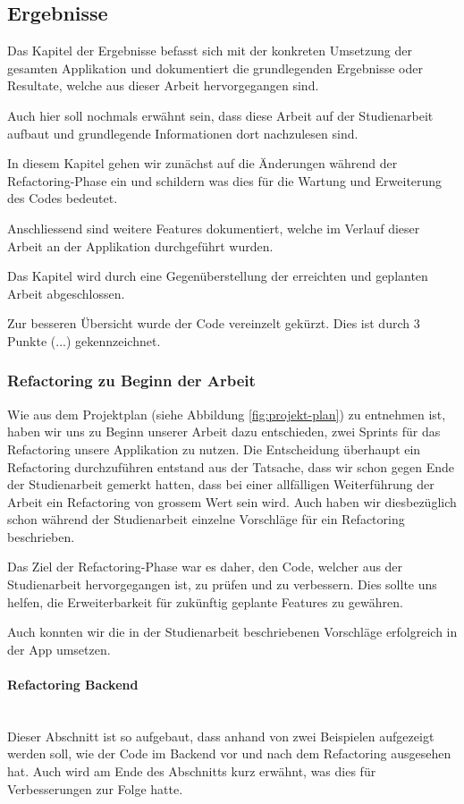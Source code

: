 \subsection{Ergebnisse}
\label{subsec:results}
Das Kapitel der Ergebnisse befasst sich mit der konkreten Umsetzung der gesamten Applikation und dokumentiert die grundlegenden Ergebnisse oder Resultate, welche aus dieser Arbeit hervorgegangen sind. 

Auch hier soll nochmals erwähnt sein, dass diese Arbeit auf der Studienarbeit \cite{methode635-sa} aufbaut und grundlegende Informationen dort nachzulesen sind. 

In diesem Kapitel gehen wir zunächst auf die Änderungen während der Refactoring-Phase ein und schildern was dies für die Wartung und Erweiterung des Codes bedeutet. 

Anschliessend sind weitere Features dokumentiert, welche im Verlauf dieser Arbeit an der Applikation durchgeführt wurden.

Das Kapitel wird durch eine Gegenüberstellung der erreichten und geplanten Arbeit abgeschlossen.

Zur besseren Übersicht wurde der Code vereinzelt gekürzt. Dies ist durch 3 Punkte (...) gekennzeichnet.

\subsubsection{Refactoring zu Beginn der Arbeit}
Wie aus dem Projektplan (siehe Abbildung \ref{fig:projekt-plan}) zu entnehmen ist, haben wir uns zu Beginn unserer Arbeit dazu entschieden, zwei Sprints für das Refactoring unsere Applikation zu nutzen. Die Entscheidung überhaupt ein Refactoring durchzuführen entstand aus der Tatsache, dass wir schon gegen Ende der Studienarbeit gemerkt hatten, dass bei einer allfälligen Weiterführung der Arbeit ein Refactoring von grossem Wert sein wird. Auch haben wir diesbezüglich schon während der Studienarbeit einzelne Vorschläge für ein Refactoring beschrieben.


Das Ziel der Refactoring-Phase war es daher, den Code, welcher aus der Studienarbeit hervorgegangen ist, zu prüfen und zu verbessern. Dies sollte uns helfen, die Erweiterbarkeit für zukünftig geplante Features zu gewähren.

Auch konnten wir die in der Studienarbeit beschriebenen Vorschläge erfolgreich in der App umsetzen.
 
\paragraph*{Refactoring Backend}~\\
Dieser Abschnitt ist so aufgebaut, dass anhand von zwei Beispielen aufgezeigt werden soll, wie der Code im Backend vor und nach dem Refactoring ausgesehen hat. Auch wird am Ende des Abschnitts kurz erwähnt, was dies für Verbesserungen zur Folge hatte.

